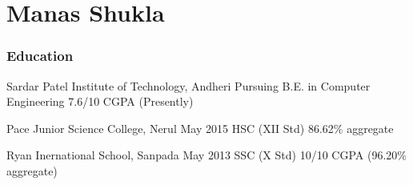\documentclass{tccv}
\begin{document}
\part{Manas Shukla}

\section{Education}

\begin{yearlist}
\item[Sardar Patel Institute of Technology, Andheri]{Pursuing}
     {B.E. in Computer Engineering}
     {7.6/10 CGPA (Presently)}

\item[Pace Junior Science College, Nerul]{May 2015}
     {HSC (XII Std)}
     {86.62\% aggregate}

\item[Ryan Inernational School, Sanpada]{May 2013}
     {SSC (X Std)}
     {10/10 CGPA (96.20\% aggregate)}
     
     

\end{yearlist}
\end{document}
